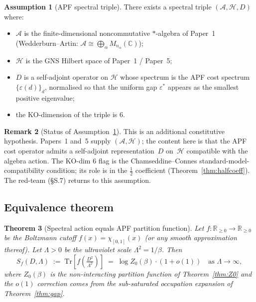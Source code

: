 \documentclass[11pt,a4paper]{article}
\newtheorem{theorem}{Theorem}[section]
\theoremstyle{definition}
\newtheorem{remark}[theorem]{Remark}
\newtheorem{assumption}[theorem]{Assumption}
\newcommand{\eps}{\varepsilon}
\newcommand{\epsstar}{\varepsilon^{\ast}}
\newcommand{\Tr}{\mathrm{Tr}}
\begin{document}
\begin{assumption}[APF spectral triple]
\label{ass:triple}
There exists a spectral triple $(\mathcal{A},\mathcal{H},D)$ where:
\begin{itemize}[leftmargin=*,nosep]
  \item $\mathcal{A}$ is the finite-dimensional noncommutative $*$-algebra of Paper~1 (Wedderburn--Artin: $\mathcal{A}\cong\bigoplus_\alpha M_{n_\alpha}(\mathbb{C})$);
  \item $\mathcal{H}$ is the GNS Hilbert space of Paper~1 / Paper~5;
  \item $D$ is a self-adjoint operator on $\mathcal{H}$ whose spectrum is the APF cost spectrum $\{\eps(d)\}_d$, normalised so that the uniform gap $\epsstar$ appears as the smallest positive eigenvalue;
  \item the KO-dimension of the triple is $6$.
\end{itemize}
\end{assumption}

\begin{remark}[Status of Assumption~\ref{ass:triple}]
This is an additional constitutive hypothesis.  Papers~1 and~5 supply $(\mathcal{A},\mathcal{H})$; the content here is that the APF cost operator admits a self-adjoint representation~$D$ on~$\mathcal{H}$ compatible with the algebra action.  The KO-dim 6 flag is the Chamseddine--Connes standard-model-compatibility condition; its role is in the $\tfrac12$ coefficient (Theorem~\ref{thm:halfcoeff}).  The red-team (§S.7) returns to this assumption.
\end{remark}

\subsection{Equivalence theorem}

\begin{theorem}[Spectral action equals APF partition function]
\label{thm:SAeqZ}
Let $f:\mathbb{R}_{\geq 0}\to\mathbb{R}_{\geq 0}$ be the Boltzmann cutoff $f(x)=\chi_{[0,1]}(x)$ (or any smooth approximation thereof).  Let $\Lambda>0$ be the ultraviolet scale $\Lambda^2=1/\beta$.  Then
\[
\boxed{
  S_f(D,\Lambda) \;:=\; \Tr\!\left[f\!\left(\tfrac{D^2}{\Lambda^2}\right)\right]
  \;=\;
  \log Z_0(\beta) \cdot (1+o(1))
  \quad\text{as }\Lambda\to\infty,
}
\]
where $Z_0(\beta)$ is the non-interacting partition function of Theorem~\ref{thm:Z0} and the $o(1)$ correction comes from the sub-saturated occupation expansion of Theorem~\ref{thm:gap}.
\end{theorem}
\end{document}
